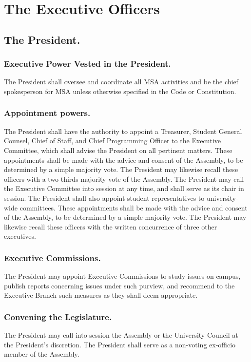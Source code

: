 
\section{The Executive Officers}

\subsection{The President.}
\subsubsection{Executive Power Vested in the President.}
The President shall oversee and coordinate all MSA activities and be the chief spokesperson for MSA unless otherwise specified in the Code or Constitution.
\subsubsection{Appointment powers.}
The President shall have the authority to appoint a Treasurer, Student General Counsel, Chief of Staff, and Chief Programming Officer to the Executive Committee, which shall advise the President on all pertinent matters.  These appointments shall be made with the advice and consent of the Assembly, to be determined by a simple majority vote.  The President may likewise recall these officers with a two-thirds majority vote of the Assembly.  The President may call the Executive Committee into session at any time, and shall serve as its chair in session.
The President shall also appoint student representatives to university-wide committees.  These appointments shall be made with the advice and consent of the Assembly, to be determined by a simple majority vote.  The President may likewise recall these officers with the written concurrence of three other executives.
	
\subsubsection{Executive Commissions.}
The President may appoint Executive Commissions to study issues on campus, publish reports concerning issues under such purview, and recommend to the Executive Branch such measures as they shall deem appropriate.

\subsubsection{Convening the Legislature.}
The President may call into session the Assembly or the University Council at the President's discretion. The President shall serve as a non-voting ex-officio member of the Assembly.

